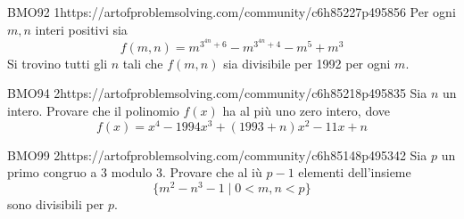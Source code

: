 \documentclass[12pt]{article}
\begin{document}
\begin{esercizio}{BMO92 1}{https://artofproblemsolving.com/community/c6h85227p495856}
Per ogni $m,n$ interi positivi sia
\[f(m,n)=m^{3^{4n}+6}-m^{3^{4n}+4}-m^{5}+m^{3}\]
Si trovino tutti gli $n$ tali che $f(m,n)$ sia divisibile per 1992 per ogni $m$.
\end{esercizio}

\begin{esercizio}{BMO94 2}{https://artofproblemsolving.com/community/c6h85218p495835}
Sia $n$ un intero. Provare che il polinomio $f(x)$ ha al più uno zero intero, dove
\[f(x)=x^{4}-1994x^{3}+(1993+n)x^{2}-11x+n\]
\end{esercizio}

\begin{esercizio}{BMO99 2}{https://artofproblemsolving.com/community/c6h85148p495342}
Sia $p$ un primo congruo a 3 modulo 3. Provare che al iù $p-1$ elementi dell'insieme 
\[\{m^{2}-n^{3}-1\mid 0<m,n<p\}\]
sono divisibili per $p$.
\end{esercizio}
\end{document}
